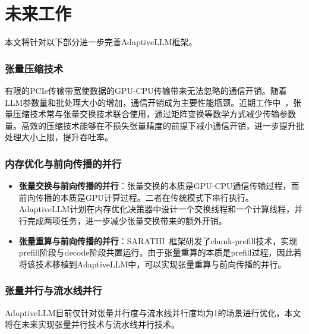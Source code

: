\section{未来工作}

本文将针对以下部分进一步完善AdaptiveLLM框架。

\subsubsection{张量压缩技术}

有限的PCIe传输带宽使数据的GPU-CPU传输带来无法忽略的通信开销。随着LLM参数量和批处理大小的增加，通信开销成为主要性能瓶颈。近期工作中~\cite{Swapping}，张量压缩技术常与张量交换技术联合使用，通过矩阵变换等数学方式减少传输参数量。高效的压缩技术能够在不损失张量精度的前提下减小通信开销，进一步提升批处理大小上限，提升吞吐率。

\subsubsection{内存优化与前向传播的并行}

\begin{itemize}

  \item \textbf{张量交换与前向传播的并行}：张量交换的本质是GPU-CPU通信传输过程，而前向传播的本质是GPU计算过程。二者在传统模式下串行执行。AdaptiveLLM计划在内存优化决策器中设计一个交换线程和一个计算线程，并行完成两项任务，进一步减少张量交换带来的额外开销。

  \item \textbf{张量重算与前向传播的并行}：SARATHI~\cite{SARATHI}框架研发了chunk-prefill技术，实现prefill阶段与decode阶段共置运行。由于张量重算的本质是prefill过程，因此若将该技术移植到AdaptiveLLM中，可以实现张量重算与前向传播的并行。

\end{itemize}

\subsubsection{张量并行与流水线并行~\cite{Parallelism}} AdaptiveLLM目前仅针对张量并行度与流水线并行度均为1的场景进行优化，本文将在未来实现张量并行技术与流水线并行技术。